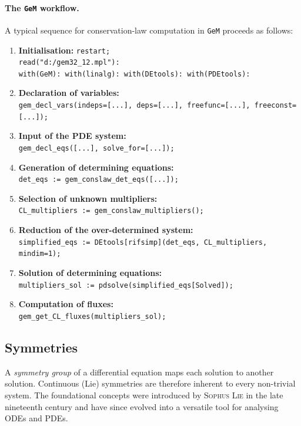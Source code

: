\documentclass[alpha-refs, 12pt]{wiley-article}
\begin{document}
\paragraph{The \texttt{GeM} workflow.}
A typical sequence for conservation-law computation in \texttt{GeM} proceeds as follows:
\begin{enumerate}[label=(\roman*)]
  \item \textbf{Initialisation:}
        \verb|restart;|\\
        \verb|read("d:/gem32_12.mpl"):|\\
        \verb|with(GeM): with(linalg): with(DEtools): with(PDEtools):|
  \item \textbf{Declaration of variables:}\\
        \verb|gem_decl_vars(indeps=[...], deps=[...], freefunc=[...], freeconst=[...]);|
  \item \textbf{Input of the PDE system:}\\
        \verb|gem_decl_eqs([...], solve_for=[...]);|
  \item \textbf{Generation of determining equations:}\\
        \verb|det_eqs := gem_conslaw_det_eqs([...]);|
  \item \textbf{Selection of unknown multipliers:}\\
        \verb|CL_multipliers := gem_conslaw_multipliers();|
  \item \textbf{Reduction of the over-determined system:}\\
        \verb|simplified_eqs := DEtools[rifsimp](det_eqs, CL_multipliers, mindim=1);|
  \item \textbf{Solution of determining equations:}\\
        \verb|multipliers_sol := pdsolve(simplified_eqs[Solved]);|
  \item \textbf{Computation of fluxes:}\\
        \verb|gem_get_CL_fluxes(multipliers_sol);|
\end{enumerate}

\subsection{Symmetries}\label{ssec:symm}
\textbf{}
A \emph{symmetry group} of a differential equation maps each solution to another solution. Continuous (Lie) symmetries are therefore inherent to every non-trivial system. The foundational concepts were introduced by \textsc{Sophus Lie} in the late nineteenth century and have since evolved into a versatile tool for analysing ODEs and PDEs.
\end{document}
